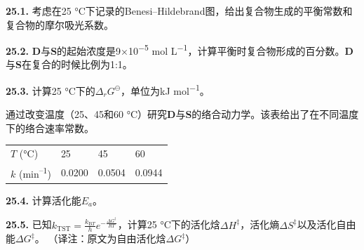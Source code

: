 \noindent\textbf{25.1.} 考虑在25
°C下记录的Benesi--Hildebrand图，给出复合物生成的平衡常数和复合物的摩尔吸光系数。


\noindent\textbf{25.2.}
\textbf{D}与\textbf{S}的起始浓度是9×10\textsuperscript{−5} mol
L\textsuperscript{−1}，计算平衡时复合物形成的百分数。\textbf{D}与\textbf{S}在复合的时候比例为1:1。

\noindent\textbf{25.3.} 计算25 °C下的\(\Delta_rG^\ominus\)，单位为kJ
mol\textsuperscript{−1}。

通过改变温度（25、45和60 °C）研究\textbf{D}与\textbf{S}的络合动力学。该表给出了在不同温度下的络合速率常数。

\begin{longtable}[]{@{}llll@{}}
	\toprule
	$T$ (°C) &25&45&60 \tabularnewline
	$k$ (min\textsuperscript{--1}) & 0.0200 &0.0504&0.0944\tabularnewline
	\bottomrule
\end{longtable}

\noindent\textbf{25.4.} 计算活化能\(E_a\)。

\noindent\textbf{25.5.}
已知\(k_{\mathrm{TST}}=\frac{k_{\mathrm BT}}{h}e^{-\frac{\Delta G^\ddag}{RT}}\)，计算25 °C下的活化焓\(\Delta H^\ddag\)，活化熵\(\Delta S^\ddag\)以及活化自由能\(\Delta G^\ddag\)。
（译注：原文为自由活化焓\(\Delta G^\ddag\)）
